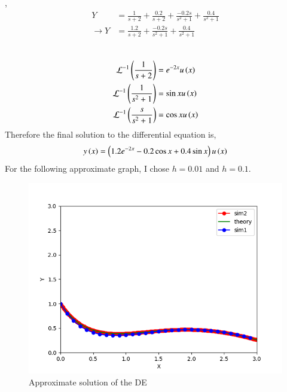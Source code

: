 \documentclass[journal]{IEEEtran}
\begin{document}
    ,\\
\begin{align}
    Y &= \frac{1}{s + 2} + \frac{0.2}{s+2} + \frac{-0.2s}{s^2 + 1} + \frac{0.4}{s^2 + 1}\\
    \xrightarrow{} Y &=  \frac{1.2}{s + 2} + \frac{-0.2s}{s^2 + 1} + \frac{0.4}{s^2 + 1}\\
\end{align}
    \\
\begin{align}
    \mathcal{L}^{-1}\left(\frac{1}{s+2}\right) &= e^{-2x}u\left(x\right)\\
    \mathcal{L}^{-1}\left(\frac{1}{s^2+1}\right) &= \sin xu\left(x\right)\\
    \mathcal{L}^{-1}\left(\frac{s}{s^2+1}\right) &= \cos xu\left(x\right)
\end{align}
Therefore the final solution to the differential equation is,
\begin{align}
    y\left(x\right) = \left(1.2e^{-2x} - 0.2\cos x + 0.4\sin x\right)u\left(x\right) 
\end{align}
For the following approximate graph, I chose $h = 0.01$ and $h = 0.1$.
\begin{figure}[h!]
   \centering
   \includegraphics[width=0.7\columnwidth]{figs/fig.png}
    \caption{Approximate solution of the DE}
\end{figure}
\end{document}
